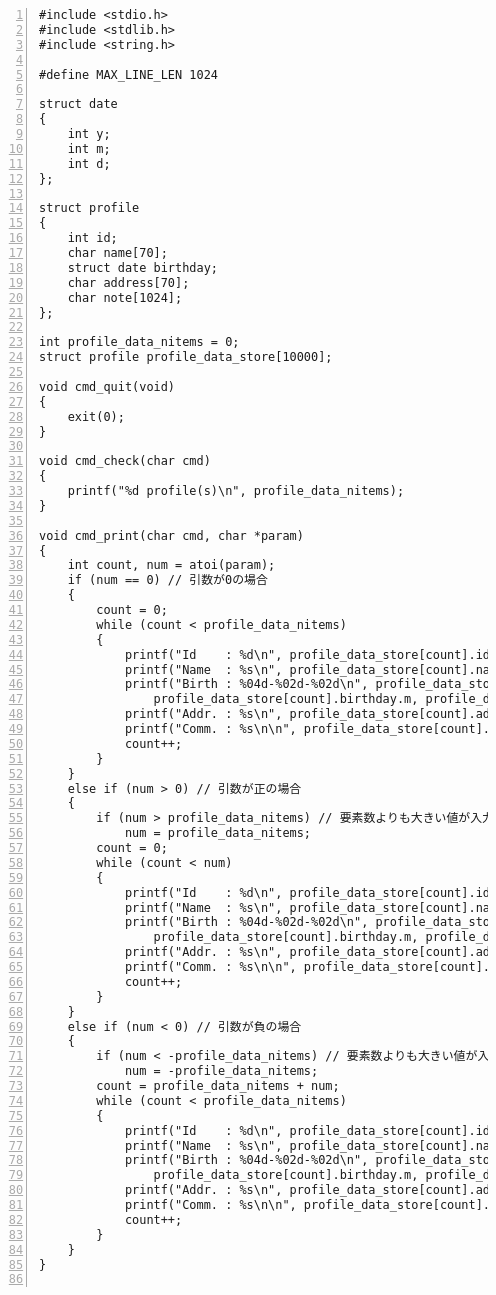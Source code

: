 \documentclass[autodetect-engine,dvi=dvipdfmx,ja=standard,
               a4j,11pt]{bxjsarticle}
\begin{document}
\begin{Verbatim}[numbers=left, xleftmargin=10mm, numbersep=6pt,
    fontsize=\small, baselinestretch=0.8]
#include <stdio.h>
#include <stdlib.h>
#include <string.h>

#define MAX_LINE_LEN 1024

struct date
{
    int y;
    int m;
    int d;
};

struct profile
{
    int id;
    char name[70];
    struct date birthday;
    char address[70];
    char note[1024];
};

int profile_data_nitems = 0;
struct profile profile_data_store[10000];

void cmd_quit(void)
{
    exit(0);
}

void cmd_check(char cmd)
{
    printf("%d profile(s)\n", profile_data_nitems);
}

void cmd_print(char cmd, char *param)
{
    int count, num = atoi(param);
    if (num == 0) // 引数が0の場合
    {
        count = 0;
        while (count < profile_data_nitems)
        {
            printf("Id    : %d\n", profile_data_store[count].id);
            printf("Name  : %s\n", profile_data_store[count].name);
            printf("Birth : %04d-%02d-%02d\n", profile_data_store[count].birthday.y,
                profile_data_store[count].birthday.m, profile_data_store[count].birthday.d);
            printf("Addr. : %s\n", profile_data_store[count].address);
            printf("Comm. : %s\n\n", profile_data_store[count].note);
            count++;
        }
    }
    else if (num > 0) // 引数が正の場合
    {
        if (num > profile_data_nitems) // 要素数よりも大きい値が入力された場合
            num = profile_data_nitems;
        count = 0;
        while (count < num)
        {
            printf("Id    : %d\n", profile_data_store[count].id);
            printf("Name  : %s\n", profile_data_store[count].name);
            printf("Birth : %04d-%02d-%02d\n", profile_data_store[count].birthday.y,
                profile_data_store[count].birthday.m, profile_data_store[count].birthday.d);
            printf("Addr. : %s\n", profile_data_store[count].address);
            printf("Comm. : %s\n\n", profile_data_store[count].note);
            count++;
        }
    }
    else if (num < 0) // 引数が負の場合
    {
        if (num < -profile_data_nitems) // 要素数よりも大きい値が入力された場合
            num = -profile_data_nitems;
        count = profile_data_nitems + num;
        while (count < profile_data_nitems)
        {
            printf("Id    : %d\n", profile_data_store[count].id);
            printf("Name  : %s\n", profile_data_store[count].name);
            printf("Birth : %04d-%02d-%02d\n", profile_data_store[count].birthday.y,
                profile_data_store[count].birthday.m, profile_data_store[count].birthday.d);
            printf("Addr. : %s\n", profile_data_store[count].address);
            printf("Comm. : %s\n\n", profile_data_store[count].note);
            count++;
        }
    }
}


\end{Verbatim}
\end{document}
